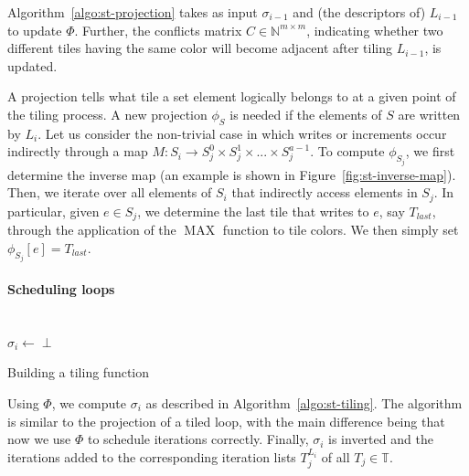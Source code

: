 Algorithm~\ref{algo:st-projection} takes as input $\sigma_{i-1}$ and (the descriptors of) $L_{i-1}$ to update $\Phi$. Further, the conflicts matrix $C \in \mathbb{N}^{m \times m}$, indicating whether two different tiles having the same color will become adjacent after tiling $L_{i-1}$, is updated. 

A projection tells what tile a set element logically belongs to at a given point of the tiling process. A new projection $\phi_{S}$ is needed if the elements of $S$ are written by $L_i$. Let us consider the non-trivial case in which writes or increments occur indirectly through a map $M : S_i \rightarrow S_j^0 \times S_j^1 \times ... \times S_j^{a-1}$. To compute $\phi_{S_{j}}$, we first determine the inverse map (an example is shown in Figure~\ref{fig:st-inverse-map}). Then, we iterate over all elements of $S_i$ that indirectly access elements in $S_j$. In particular, given $e \in S_j$, we determine the last tile that writes to $e$, say $T_{last}$, through the application of the $\operatorname{MAX}$ function to tile colors. We then simply set $\phi_{S_{j}}[e] = T_{last}$. 



\paragraph{Scheduling loops} 

\begin{algorithm}[t]
\nonl ~\\
$\sigma_i \gets \perp$\;
\caption{Building a tiling function}
\label{algo:st-tiling}
\end{algorithm}

Using $\Phi$, we compute $\sigma_i$ as described in Algorithm~\ref{algo:st-tiling}. The algorithm is similar to the projection of a tiled loop, with the main difference being that now we use $\Phi$ to schedule iterations correctly. Finally, $\sigma_i$ is inverted and the iterations added to the corresponding iteration lists $T_j^{L_i}$ of all $T_j \in \mathbb{T}$. 


